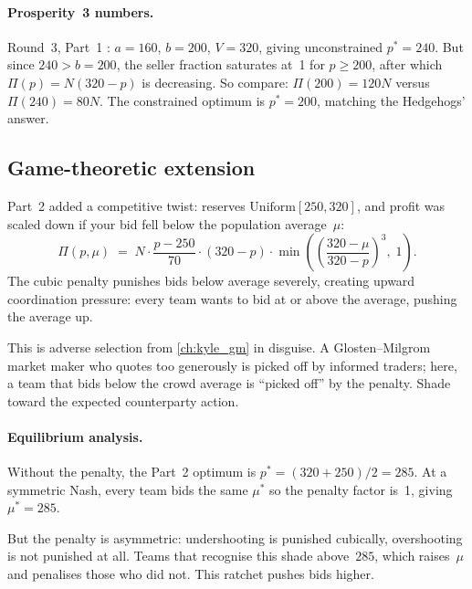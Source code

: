 \paragraph{Prosperity~3 numbers.}
Round~3, Part~1 \citep{frankfurtHedgehogs2025imcP3}:
$a = 160$, $b = 200$, $V = 320$, giving unconstrained $p^* = 240$.
But since $240 > b = 200$, the seller fraction saturates at~1
for $p \ge 200$, after which $\Pi(p) = N(320 - p)$ is decreasing.
So compare: $\Pi(200) = 120N$ versus $\Pi(240) = 80N$.  The
constrained optimum is $p^* = 200$, matching the Hedgehogs'
answer.

\subsection{Game-theoretic extension}

Part~2 added a competitive twist: reserves $\mathrm{Uniform}[250,
320]$, and profit was scaled down if your bid fell below the
population average~$\mu$:
\begin{equation}
  \Pi(p, \mu)
  \;=\;
  N \cdot \frac{p - 250}{70} \cdot (320 - p)
  \cdot \min\!\left(
    \left(\frac{320 - \mu}{320 - p}\right)^{\!3},\; 1
  \right).
  \label{eq:ch25_reserve_game}
\end{equation}
The cubic penalty punishes bids below average severely, creating
upward coordination pressure: every team wants to bid at or above
the average, pushing the average up.

\begin{intuitionbox}
This is adverse selection from \cref{ch:kyle_gm} in disguise.  A
Glosten--Milgrom market maker who quotes too generously is picked
off by informed traders; here, a team that bids below the crowd
average is ``picked off'' by the penalty.  Shade toward the
expected counterparty action.
\end{intuitionbox}

\paragraph{Equilibrium analysis.}
Without the penalty, the Part~2 optimum is $p^* = (320+250)/2 = 285$.
At a symmetric Nash, every team bids the same $\mu^*$ so the
penalty factor is~1, giving $\mu^* = 285$.

But the penalty is asymmetric: undershooting is punished cubically,
overshooting is not punished at all.  Teams that recognise this
shade above~$285$, which raises~$\mu$ and penalises those who did
not.  This ratchet pushes bids higher.

